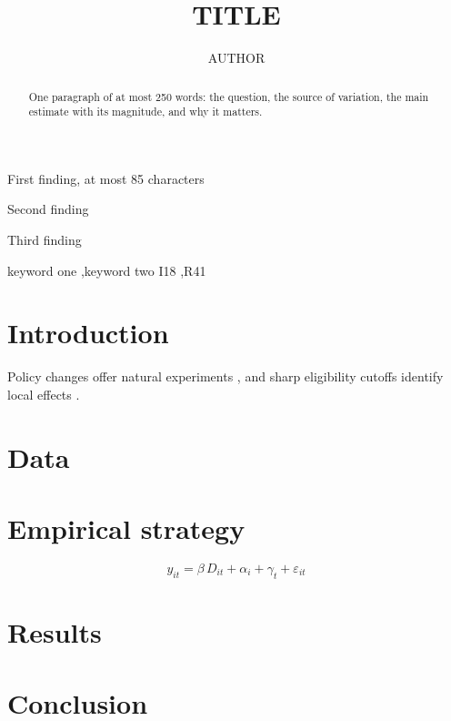 \documentclass[review,12pt,authoryear]{elsarticle}
\begin{document}
\begin{frontmatter}

\title{{{TITLE}}}

\author[inst1]{{{AUTHOR}}}

\begin{abstract}
One paragraph of at most 250 words: the question, the source of variation, the main estimate with its magnitude, and why it matters.
\end{abstract}

\begin{highlights}
\item First finding, at most 85 characters
\item Second finding
\item Third finding
\end{highlights}

\begin{keyword}
keyword one \sep keyword two
\JEL I18 \sep R41
\end{keyword}

\end{frontmatter}

\section{Introduction}\label{sec:intro}
Policy changes offer natural experiments \citep{card1994minimum}, and sharp eligibility cutoffs identify local effects \citep{imbens2008regression}.

\section{Data}\label{sec:data}

\section{Empirical strategy}\label{sec:strategy}
\begin{equation}\label{eq:main}
  y_{it} = \beta \, D_{it} + \alpha_i + \gamma_t + \varepsilon_{it}
\end{equation}

\section{Results}\label{sec:results}

\section{Conclusion}\label{sec:conclusion}



\end{document}
